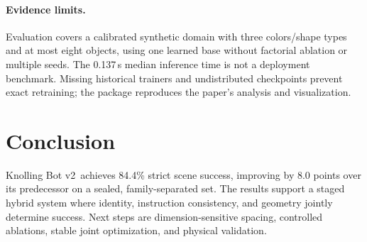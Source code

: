 \documentclass{article}
\newcommand{\sys}{Knolling Bot v2}
\begin{document}
\paragraph{Evidence limits.}
Evaluation covers a calibrated synthetic domain with three colors/shape types and at most eight objects, using one learned base without factorial ablation or multiple seeds. The 0.137\,s median inference time is not a deployment benchmark. Missing historical trainers and undistributed checkpoints prevent exact retraining; the package reproduces the paper's analysis and visualization.

\section{Conclusion}
\sys\ achieves 84.4\% strict scene success, improving by 8.0 points over its predecessor on a sealed, family-separated set. The results support a staged hybrid system where identity, instruction consistency, and geometry jointly determine success. Next steps are dimension-sensitive spacing, controlled ablations, stable joint optimization, and physical validation.

\clearpage
\begingroup
\raggedright


\endgroup
\clearpage
\appendix

\end{document}
